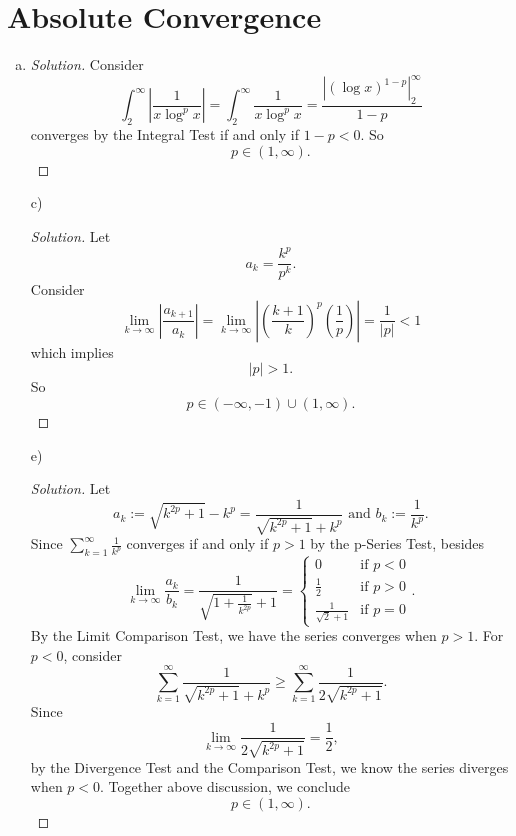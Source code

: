 \documentclass{report}
\newenvironment{solution}
  {\begin{proof}[Solution]}
  {\end{proof}}
\begin{document}
\section{Absolute Convergence}
\setcounter{Exercise}{2}
\begin{Exercise}
\begin{enumerate}[a)]
\item
\begin{solution}
Consider $$\int_{2}^{\infty}\left|\frac{1}{x\log^p{x}}\right| = \int_{2}^{\infty}\frac{1}{x\log^p{x}} = \frac{\left|(\log{x})^{1-p}\right|_{2}^{\infty}}{1-p} $$
converges by the Integral Test if and only if $1-p<0$. So $$p \in (1,\infty).$$
\end{solution}

\item [c)]
\begin{solution}
Let $$a_k = \frac{k^p}{p^k}. $$
Consider
$$\lim_{k\to\infty}\left|\frac{a_{k+1}}{a_k}\right| = \lim_{k\to\infty}\left|\left(\frac{k+1}{k}\right)^p\left(\frac{1}{p}\right)\right| = \frac{1}{|p|} < 1$$
which implies $$|p|>1.$$
So$$p\in(-\infty,-1)\cup (1,\infty).$$
\end{solution}

\item [e)]
\begin{solution}
Let $$a_k := \sqrt{k^{2p}+1}-k^p = \frac{1}{\sqrt{k^{2p}+1}+k^p}\text{ and } b_k := \frac{1}{k^p}.$$
Since $\sum_{k=1}^{\infty}\frac{1}{k^p}$ converges if and only if $p>1$ by the p-Series Test, besides
$$\lim_{k\to\infty}\frac{a_k}{b_k} = \frac{1}{\sqrt{1+\frac{1}{k^{2p}}}+1} = \begin{cases}0 & \mbox{if }p<0 \\ \frac{1}{2} & \mbox{if }p>0 \\ \frac{1}{\sqrt{2}+1} & \mbox{if } p = 0\end{cases}.$$
By the Limit Comparison Test, we have the series converges when $p>1$. For $p<0$, consider $$\sum_{k=1}^{\infty}\frac{1}{\sqrt{k^{2p}+1}+k^p} \geq \sum_{k=1}^{\infty}\frac{1}{2\sqrt{k^{2p}+1}}.$$
Since $$\lim_{k\to\infty}\frac{1}{2\sqrt{k^{2p}+1}} = \frac{1}{2},$$
by the Divergence Test and the Comparison Test, we know the series diverges when $p<0$.
Together above discussion, we conclude $$p\in(1,\infty).$$
\end{solution}
\end{enumerate}
\end{Exercise}
\end{document}

